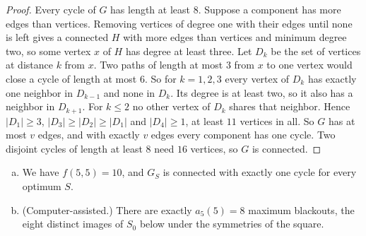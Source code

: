 \begin{proof}
Every cycle of $G$ has length at least $8$. Suppose a component has more edges than
vertices. Removing vertices of degree one with their edges until none is left gives a connected
$H$ with more edges than vertices and minimum degree two, so some vertex $x$ of $H$ has degree
at least three. Let $D_k$ be the set of vertices at distance $k$ from $x$. Two paths of length
at most $3$ from $x$ to one vertex would close a cycle of length at most $6$. So for $k=1,2,3$
every vertex of $D_k$ has exactly one neighbor in $D_{k-1}$ and none in $D_k$. Its degree is
at least two, so it also has a neighbor in $D_{k+1}$. For $k\le2$ no other vertex of $D_k$
shares that neighbor. Hence $|D_1|\ge3$, $|D_3|\ge|D_2|\ge|D_1|$ and $|D_4|\ge1$, at least
$11$ vertices in all. So $G$ has at most $v$ edges, and with exactly $v$ edges every
component has one cycle. Two disjoint cycles of length at least $8$ need $16$ vertices, so $G$ is connected.
\end{proof}

\begin{theorem}\label{thm:fivefive}
\begin{enumerate}[(a)]
\item We have $f(5,5)=10$, and $G_S$ is connected with exactly one cycle for every optimum $S$.
\item (Computer-assisted.) There are exactly $a_5(5)=8$ maximum blackouts, the eight distinct
images of $S_0$ below under the symmetries of the square.
\end{enumerate}
\end{theorem}

